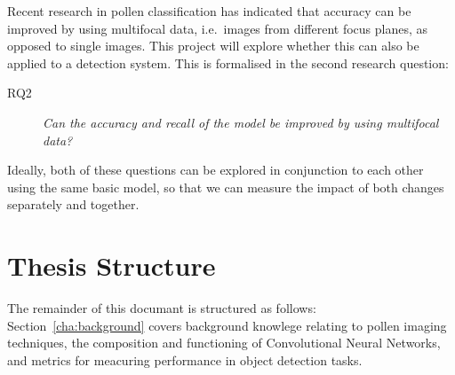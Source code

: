 Recent research in pollen classification has indicated that accuracy can be improved by using multifocal data, i.e.\ images from different focus planes, as opposed to single images.
This project will explore whether this can also be applied to a detection system.
This is formalised in the second research question:

\begin{description}
    \item[RQ2] \textit{Can the accuracy and recall of the model be improved by using multifocal data?}
\end{description}

Ideally, both of these questions can be explored in conjunction to each other using the same basic model, so that we can measure the impact of both changes separately and together.

\section{Thesis Structure}\label{sec:thesisStructure}
The remainder of this documant is structured as follows:
Section~\ref{cha:background} covers background knowlege relating to pollen imaging techniques, the composition and functioning of Convolutional Neural Networks, and metrics for meacuring performance in object detection tasks.